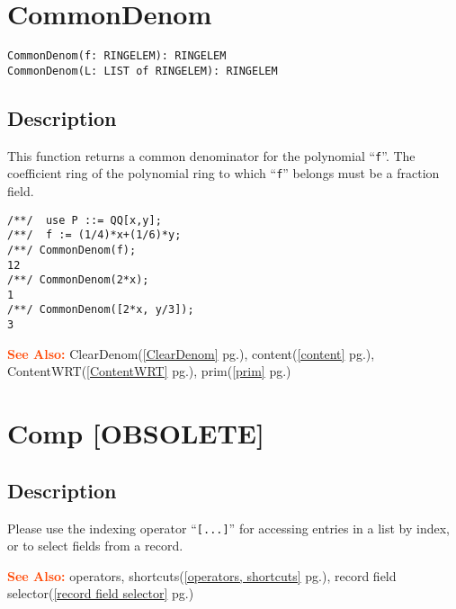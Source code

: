 \documentclass[a4paper]{mybook}
\newenvironment{command}{}{} %
\newcommand\SeeAlso{\par\textcolor{OrangeRed}{\textbf{\large See Also: }}}
\begin{document}
\section{CommonDenom}
\label{CommonDenom}
\begin{command} %


\begin{Verbatim}[label=syntax, rulecolor=\color{MidnightBlue},
frame=single]
CommonDenom(f: RINGELEM): RINGELEM
CommonDenom(L: LIST of RINGELEM): RINGELEM
\end{Verbatim}


\subsection*{Description}

This function returns a common denominator for the polynomial ``\verb&f&''.
The coefficient ring of the polynomial ring to which ``\verb&f&'' belongs
must be a fraction field.
\begin{Verbatim}[label=example, rulecolor=\color{PineGreen}, frame=single]
/**/  use P ::= QQ[x,y];
/**/  f := (1/4)*x+(1/6)*y;
/**/ CommonDenom(f);
12
/**/ CommonDenom(2*x);
1
/**/ CommonDenom([2*x, y/3]);
3
\end{Verbatim}


\SeeAlso %
  ClearDenom(\ref{ClearDenom} pg.\pageref{ClearDenom}), 
    content(\ref{content} pg.\pageref{content}), 
    ContentWRT(\ref{ContentWRT} pg.\pageref{ContentWRT}), 
    prim(\ref{prim} pg.\pageref{prim})
\end{command} %

\section{Comp [OBSOLETE]}
\label{Comp [OBSOLETE]}
\begin{command} %



\subsection*{Description}

Please use the indexing operator ``\verb&[...]&'' for accessing
entries in a list by index, or to select fields from a record.

\SeeAlso %
  operators, shortcuts(\ref{operators, shortcuts} pg.\pageref{operators, shortcuts}), 
    record field selector(\ref{record field selector} pg.\pageref{record field selector})
\end{command} %
\end{document}
